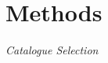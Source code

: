 \documentclass[10pt,twocolumn,letterpaper]{article}
\begin{document}







\section{Methods}
\textit{Catalogue Selection}

 


{\small



}

\pagebreak
\end{document}
